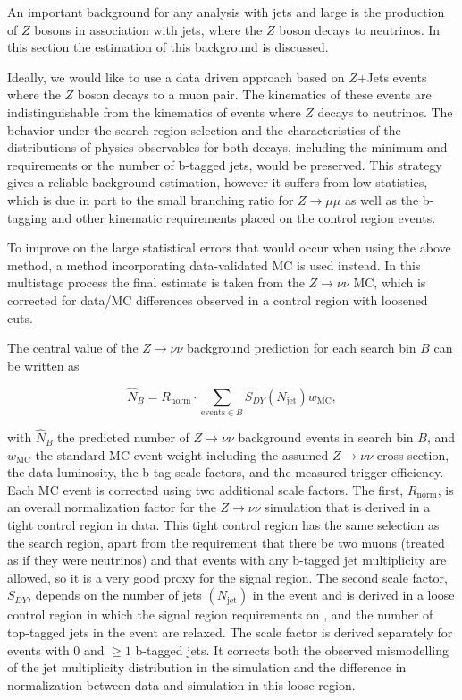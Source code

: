 An important background for any analysis with jets and large \MET is
the production of $Z$ bosons in association with jets, where the $Z$
boson decays to neutrinos.  In this section the estimation of this background
is discussed.  

Ideally, we would like to use a data driven approach based on
$Z$+Jets events where the $Z$ boson decays to a
muon pair. The kinematics of these events are indistinguishable from the
kinematics of events where $Z$ decays to neutrinos.
The behavior under the search region selection and the characteristics
of the distributions of physics observables for both decays, including the minimum
\HT and \MET requirements or the number of b-tagged jets, would be
preserved.
This strategy gives a reliable background estimation, however it suffers from
low statistics, which is due in part to the small branching ratio for $Z \rightarrow \mu \mu$
as well as the b-tagging and other kinematic requirements placed on the control
region events.

To improve on the large statistical errors that would occur when using the
above method, a method incorporating data-validated MC is used instead.
In this multistage process the final estimate is taken from the
$Z \rightarrow \nu \nu$ MC, which is corrected for
data/MC differences observed in a control region with loosened cuts.

The central value of the $Z \rightarrow \nu \nu$ background prediction
for each search bin $B$ can be written as

\begin{equation}
\widehat{N}_B = R_\textrm{norm} \cdot \sum_{\textrm{events}\in B} S_{DY}(N_\textrm{jet}) w_\textrm{MC},
\label{eq:zinv_pred}
\end{equation}

with $\widehat{N}_B$ the predicted number of $Z \rightarrow \nu \nu$
background events in search bin $B$, and $w_\textrm{MC}$ the standard MC event
weight including the assumed $Z \rightarrow \nu \nu$ cross section, the data
luminosity, the b tag scale factors,
and the measured trigger efficiency.
Each MC event is corrected using two additional scale factors. The first, $R_\textrm{norm}$,
is an overall normalization factor for the $Z \rightarrow \nu \nu$ simulation
that is derived in a tight control region in data.
This tight control region has the same selection as the search region, apart from
the requirement that there be two muons (treated as if they were neutrinos) and
that events with any b-tagged jet multiplicity are allowed, so it is a very
good proxy for the signal region.
The second scale factor, $S_{DY}$, depends on the number of jets $(N_\textrm{jet})$
in the event and is derived in a loose control region in which the signal region
requirements on \MET, \MTTwo and the number of top-tagged jets in the event are
relaxed.
The scale factor is derived separately for events with 0 and ${\geq}1$ b-tagged
jets. 
It corrects both the observed mismodelling of the jet multiplicity distribution
in the simulation and the difference in normalization between data and simulation
in this loose region.

